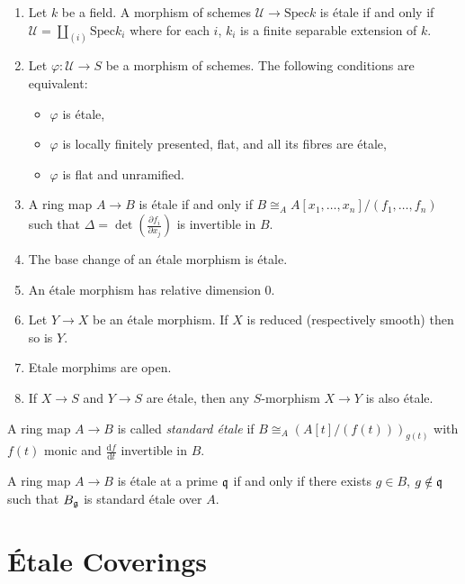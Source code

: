 \begin{proposition}
\label{prop:ofEtaleMorphisms}
\begin{enumerate}
\item
Let $k$ be a field. A morphism of schemes $\mathcal{U} \to \text{Spec} k$ is 
\'etale if and only if $\mathcal{U} = \coprod_{(i)} \text{Spec} k_i$ where for 
each $i$, $k_i$ is a finite separable extension of $k$.
\item
Let $\varphi : \mathcal{U} \to S$ be a morphism of schemes. The following 
conditions are equivalent:  
\begin{itemize}
\item $\varphi$ is \'etale,
\item $\varphi$ is locally finitely presented, flat, and all its fibres are 
\'etale,
\item $\varphi$ is flat and unramified.
\end{itemize}
\item
A ring map $A \to B$ is \'etale if and only if $B \cong_A A[x_1, 
\dots,x_n]/(f_1,\dots,f_n)$ such that $\Delta = \det \left( \frac{\partial 
f_i}{\partial x_j} \right) $ is invertible in $B$.
\item
The base change of an \'etale morphism is \'etale.
\item
An \'etale morphism has relative dimension 0.
\item
Let $Y \to X$ be an \'etale morphism. If  $X$ is reduced (respectively smooth) 
then so is $Y$.
\item 
Etale morphims are open.
\item
If $X\to S$ and $Y\to S$ are \'etale, then any $S$-morphism $X \to Y$ is also 
\'etale.
\end{enumerate}
\end{proposition}

\begin{definition}
A ring map $A \to B$ is called {\it standard \'etale} if $B \cong_A \left( 
A[t]/(f(t)) \right)_{g(t)}$ with $f(t)$ monic and 
$\frac{\mathrm{d}f}{\mathrm{d}t}$ invertible in $B$.
\end{definition}

\begin{theorem}
A ring map $A \to B$ is \'etale at a prime $\frak q$ if and only if there 
exists $g \in B$, $g \notin \frak q$ such that $B_{\frak g}$ is standard 
\'etale over $A$.
\end{theorem}

\section{\'Etale Coverings}

